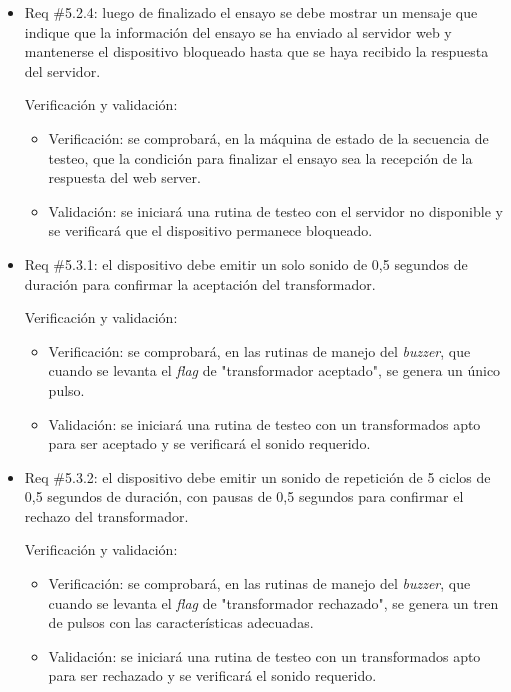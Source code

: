 \documentclass[11pt]{charter}
\begin{document}
\begin{itemize} 
\item Req \#5.2.4: luego de finalizado el ensayo se debe mostrar un mensaje que indique que la información del ensayo se ha enviado al servidor web y mantenerse el dispositivo bloqueado hasta que se haya recibido la respuesta del servidor.

Verificación y validación:

\begin{itemize}
\item Verificación: se comprobará, en la máquina de estado de la secuencia de testeo, que la condición para finalizar el ensayo sea la recepción de la respuesta del web server.
\item Validación: se iniciará una rutina de testeo con el servidor no disponible y se verificará que el dispositivo permanece bloqueado.
\end{itemize}

\end{itemize}

\begin{itemize} 
\item Req \#5.3.1: el dispositivo debe emitir un solo sonido de 0,5 segundos de duración para confirmar la aceptación del transformador.

Verificación y validación:

\begin{itemize}
\item Verificación: se comprobará, en las rutinas de manejo del \textit{buzzer}, que cuando se levanta el \textit{flag} de "transformador aceptado", se genera un único pulso.
\item Validación: se iniciará una rutina de testeo con un transformados apto para ser aceptado y se verificará el sonido requerido.  
\end{itemize}

\end{itemize}

\begin{itemize} 
\item Req \#5.3.2: el dispositivo debe emitir un sonido de repetición de 5 ciclos de 0,5 segundos de duración, con pausas de 0,5 segundos para confirmar el rechazo del transformador.

Verificación y validación:

\begin{itemize}
\item Verificación: se comprobará, en las rutinas de manejo del \textit{buzzer}, que cuando se levanta el \textit{flag} de "transformador rechazado", se genera un tren de pulsos con las características adecuadas. 
\item Validación: se iniciará una rutina de testeo con un transformados apto para ser rechazado y se verificará el sonido requerido.   
\end{itemize}

\end{itemize}
\end{document}

